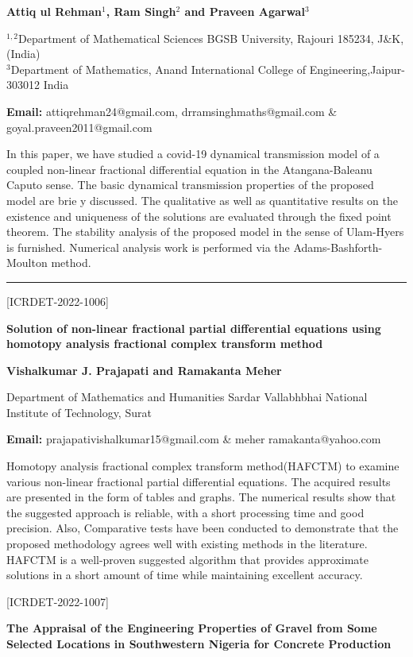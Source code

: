 \documentclass[twoside,11pt]{amsart}
\begin{document}
\centerline{\textbf{  Attiq ul Rehman$^{1}$, Ram Singh$^{2}$ and Praveen Agarwal$^{3}$ }}
\vskip 5mm
\newpage
\begin{flushleft}
$^{1,2}$Department of Mathematical Sciences
BGSB University, Rajouri 185234, J\&K,(India)\\
$^{3}$Department of Mathematics,
Anand International College of Engineering,Jaipur-303012 India
\vskip 5mm
\end{flushleft}
\vskip 2mm
\begin{flushleft}
{\bf Email:} attiqrehman24@gmail.com, drramsinghmaths@gmail.com \& goyal.praveen2011@gmail.com
\end{flushleft}
\vskip 5mm
In this paper, we have studied a covid-19 dynamical transmission model of a coupled
non-linear fractional differential equation in the Atangana-Baleanu Caputo sense. The
basic dynamical transmission properties of the proposed model are brie
y discussed.
The qualitative as well as quantitative results on the existence and uniqueness of the
solutions are evaluated through the fixed point theorem. The stability analysis of the
proposed model in the sense of Ulam-Hyers is furnished. Numerical analysis work is
performed via the Adams-Bashforth-Moulton method.
\vskip 5mm
\rule{\textwidth}{0.5pt}
\vskip 10mm
\begin{flushleft}
\centerline{[ICRDET-2022-1006]}
\end{flushleft}
\begin{center}\bf\LARGE
Solution of non-linear fractional partial differential
equations using homotopy analysis fractional
complex transform method
\end{center}
\vskip 5mm

\centerline{\textbf{ Vishalkumar J. Prajapati and Ramakanta Meher}}
\vskip 5mm
\begin{flushleft}
Department of Mathematics and Humanities
Sardar Vallabhbhai National Institute of Technology, Surat
\vskip 5mm
\end{flushleft}
\vskip 2mm
\begin{flushleft}
{\bf Email:} prajapativishalkumar15@gmail.com \& meher ramakanta@yahoo.com
\end{flushleft}
\vskip 5mm
Homotopy analysis fractional complex transform
method(HAFCTM) to examine various non-linear fractional
partial differential equations. The acquired results are presented
in the form of tables and graphs. The numerical results show that
the suggested approach is reliable, with a short processing time
and good precision. Also, Comparative tests have been conducted
to demonstrate that the proposed methodology agrees well with
existing methods in the literature. HAFCTM is a well-proven
suggested algorithm that provides approximate solutions in a
short amount of time while maintaining excellent accuracy.
\vskip 5mm
\newpage
\vskip 5mm
\begin{flushleft}
\centerline{[ICRDET-2022-1007]}
\end{flushleft}
\begin{center}\bf\LARGE
The Appraisal of the Engineering Properties of Gravel from Some Selected Locations in Southwestern Nigeria for Concrete Production
\end{center}
\vskip 5mm
\end{document}
